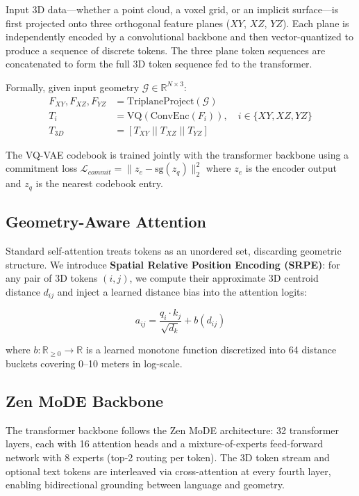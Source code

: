 \documentclass[11pt,a4paper]{article}
\begin{document}
Input 3D data---whether a point cloud, a voxel grid, or an implicit surface---is first projected
onto three orthogonal feature planes ($XY$, $XZ$, $YZ$). Each plane is independently encoded by a
convolutional backbone and then vector-quantized to produce a sequence of discrete tokens. The three
plane token sequences are concatenated to form the full 3D token sequence fed to the transformer.

Formally, given input geometry $\mathcal{G} \in \mathbb{R}^{N \times 3}$:
\begin{align}
    F_{XY}, F_{XZ}, F_{YZ} &= \text{TriplaneProject}(\mathcal{G}) \\
    T_i &= \text{VQ}(\text{ConvEnc}(F_i)), \quad i \in \{XY, XZ, YZ\} \\
    T_{3D} &= [T_{XY} \; || \; T_{XZ} \; || \; T_{YZ}]
\end{align}

The VQ-VAE codebook is trained jointly with the transformer backbone using a commitment loss
$\mathcal{L}_{commit} = \|z_e - \text{sg}(z_q)\|_2^2$ where $z_e$ is the encoder output and
$z_q$ is the nearest codebook entry.

\subsection{Geometry-Aware Attention}

Standard self-attention treats tokens as an unordered set, discarding geometric structure. We
introduce \textbf{Spatial Relative Position Encoding (SRPE)}: for any pair of 3D tokens $(i, j)$,
we compute their approximate 3D centroid distance $d_{ij}$ and inject a learned distance bias into
the attention logits:

\begin{equation}
    a_{ij} = \frac{q_i \cdot k_j}{\sqrt{d_k}} + b(d_{ij})
\end{equation}

where $b: \mathbb{R}_{\geq 0} \to \mathbb{R}$ is a learned monotone function discretized into 64
distance buckets covering 0--10 meters in log-scale.

\subsection{Zen MoDE Backbone}

The transformer backbone follows the Zen MoDE architecture: 32 transformer layers, each with 16
attention heads and a mixture-of-experts feed-forward network with 8 experts (top-2 routing per
token). The 3D token stream and optional text tokens are interleaved via cross-attention at every
fourth layer, enabling bidirectional grounding between language and geometry.
\end{document}
